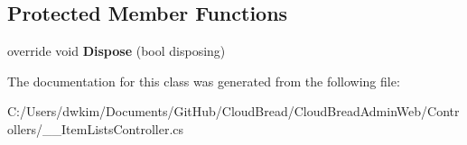 \subsection*{Protected Member Functions}
\begin{DoxyCompactItemize}
\item 
override void {\bfseries Dispose} (bool disposing)\hypertarget{class_cloud_bread_admin_web_1_1_controllers_1_1_____item_lists_controller_a8a9022d9c6ddc4f49cca9218cdc52633}{}\label{class_cloud_bread_admin_web_1_1_controllers_1_1_____item_lists_controller_a8a9022d9c6ddc4f49cca9218cdc52633}

\end{DoxyCompactItemize}


The documentation for this class was generated from the following file\+:\begin{DoxyCompactItemize}
\item 
C\+:/\+Users/dwkim/\+Documents/\+Git\+Hub/\+Cloud\+Bread/\+Cloud\+Bread\+Admin\+Web/\+Controllers/\+\_\+\+\_\+\+Item\+Lists\+Controller.\+cs\end{DoxyCompactItemize}
